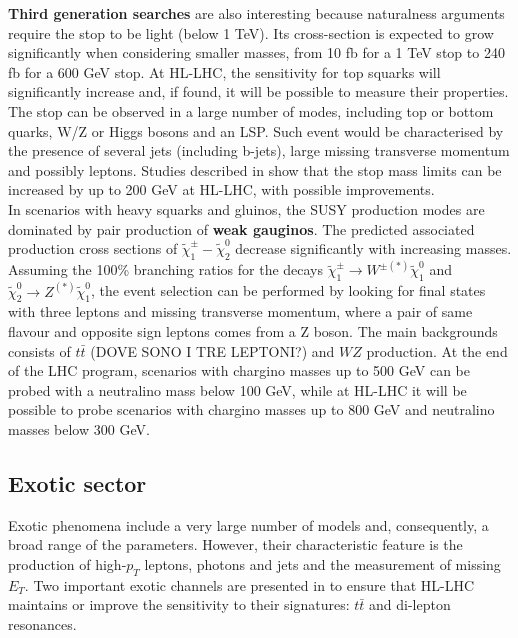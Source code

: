 \documentclass[a4paper,twoside,12pt]{article}
\begin{document}
\textbf{Third generation searches} are also interesting because naturalness arguments require
the stop to be light (below 1 TeV). Its cross-section is expected to grow significantly when 
considering smaller masses, from 10 fb for a 1 TeV stop to 240 fb for a 600 GeV stop. At
HL-LHC, the sensitivity for top squarks will significantly increase and, if found, it will be possible to measure their properties. The stop can be observed in a large number of modes,
including top or bottom
quarks, W/Z or Higgs bosons and an LSP. Such event would be characterised by the presence
of several jets (including b-jets), large missing transverse momentum and possibly leptons. 
Studies described in \cite{loi} show that the stop mass limits can be increased by up to
200 GeV at HL-LHC, with possible improvements.\\

In scenarios with heavy squarks and gluinos, the SUSY production modes are dominated by 
pair production of \textbf{weak gauginos}. The predicted associated production cross sections of $\widetilde{\chi}_1^\pm - \widetilde{\chi}_2^0$  decrease significantly
with increasing masses. Assuming the 100\% branching ratios for the decays
$\widetilde{\chi}_1^\pm \rightarrow W^{\pm(*)} \widetilde{\chi}_1^0$ and 
$\widetilde{\chi}_2^0 \rightarrow Z^{(*)}\widetilde{\chi}_1^0$, the event selection can be
performed by looking for final states with three leptons and missing transverse momentum,
where a pair of same flavour and opposite sign leptons comes from a Z boson. The main
backgrounds consists of $t\bar{t}$ (DOVE SONO I TRE LEPTONI?) and $WZ$ production.
At the end of the LHC program, scenarios with chargino masses up to 500 GeV can be probed
with a neutralino mass below 100 GeV, while at HL-LHC it will be possible to probe scenarios
with chargino masses up to 800 GeV and neutralino masses below 300 GeV.

\subsection{Exotic sector}
Exotic phenomena include a very large number of models and, consequently, a broad
range of the parameters. However, their characteristic feature is the production of high-$p_T$ 
leptons, photons and jets and the measurement of missing $E_T$. Two important exotic
channels are presented in \cite{loi} to ensure that HL-LHC maintains or improve the
sensitivity to their signatures: $t\bar{t}$ and di-lepton resonances.\\
\end{document}
